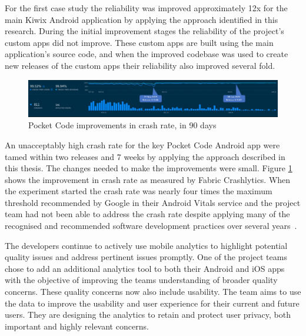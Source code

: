 For the first case study the reliability was improved approximately 12x for the main Kiwix Android application by applying the approach identified in this research. 
During the initial improvement stages the reliability of the project's custom apps did not improve. These custom apps are built using the main application's source code, and when the improved codebase was used to create new releases of the custom apps their reliability also improved several fold.

\begin{figure}[htbp!]
    \centering
    \includegraphics[width=\textwidth]{images/annotated_pocketcode_90_day_fabric_crashlytics_report.jpg}
    \caption{Pocket Code improvements in crash rate, in 90 days}
    \label{fig:pocketcode_improvements_in_crash_rate}
\end{figure}

An unacceptably high crash rate for the key Pocket Code Android app were tamed within two releases and 7 weeks by applying the approach described in this thesis. The changes needed to make the improvements were small. Figure \ref{fig:pocketcode_improvements_in_crash_rate} shows the improvement in crash rate as measured by Fabric Crashlytics. When the experiment started the crash rate was nearly four times the maximum threshold recommended by Google in their Android Vitals service and the project team had not been able to address the crash rate despite applying many of the recognised and recommended software development practices over several years~\cite{adamsen2015systematic_catrobat, luhana2018streamlining, ali2019behavior_catrobat, ali2019using_catrobat, hirsch2019approach_catrobat, schranz2019contributors_catrobat, slany2014tinkering}.

The developers continue to actively use mobile analytics to highlight potential quality issues and address pertinent issues promptly. One of the project teams chose to add an additional analytics tool to both their Android and iOS apps with the objective of improving the teams understanding of broader quality concerns. These quality concerns now also include usability. The team aims to use the data to improve the usability and user experience for their current and future users. They are designing the analytics to retain and protect user privacy, both important and highly relevant concerns.

